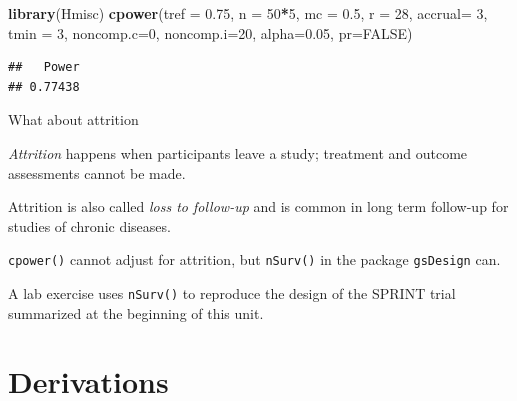 \documentclass[ignorenonframetext,]{beamer}
\newenvironment{Shaded}{\begin{snugshade}}{\end{snugshade}}
\newcommand{\DataTypeTok}[1]{\textcolor[rgb]{0.13,0.29,0.53}{#1}}
\newcommand{\DecValTok}[1]{\textcolor[rgb]{0.00,0.00,0.81}{#1}}
\newcommand{\FloatTok}[1]{\textcolor[rgb]{0.00,0.00,0.81}{#1}}
\newcommand{\KeywordTok}[1]{\textcolor[rgb]{0.13,0.29,0.53}{\textbf{#1}}}
\newcommand{\NormalTok}[1]{#1}
\newcommand{\OperatorTok}[1]{\textcolor[rgb]{0.81,0.36,0.00}{\textbf{#1}}}
\newcommand{\OtherTok}[1]{\textcolor[rgb]{0.56,0.35,0.01}{#1}}
\begin{document}
\begin{frame}[fragile]

\scriptsize

\begin{Shaded}
\begin{Highlighting}[]
\KeywordTok{library}\NormalTok{(Hmisc)}
\KeywordTok{cpower}\NormalTok{(}\DataTypeTok{tref =} \FloatTok{0.75}\NormalTok{, }\DataTypeTok{n =} \DecValTok{50}\OperatorTok{*}\DecValTok{5}\NormalTok{, }\DataTypeTok{mc =} \FloatTok{0.5}\NormalTok{, }
       \DataTypeTok{r =} \DecValTok{28}\NormalTok{, }\DataTypeTok{accrual=} \DecValTok{3}\NormalTok{, }\DataTypeTok{tmin =} \DecValTok{3}\NormalTok{, }\DataTypeTok{noncomp.c=}\DecValTok{0}\NormalTok{, }\DataTypeTok{noncomp.i=}\DecValTok{20}\NormalTok{, }
       \DataTypeTok{alpha=}\FloatTok{0.05}\NormalTok{, }\DataTypeTok{pr=}\OtherTok{FALSE}\NormalTok{)}
\end{Highlighting}
\end{Shaded}

\begin{verbatim}
##   Power 
## 0.77438
\end{verbatim}

\end{frame}

\begin{frame}{%
\protect\hypertarget{what-about-attrition}{%
What about attrition}}

\emph{Attrition} happens when participants leave a study; treatment and
outcome assessments cannot be made.

Attrition is also called \emph{loss to follow-up} and is common in long
term follow-up for studies of chronic diseases.

\texttt{cpower()} cannot adjust for attrition, but \texttt{nSurv()} in
the package \texttt{gsDesign} can.

A lab exercise uses \texttt{nSurv()} to reproduce the design of the
SPRINT trial summarized at the beginning of this unit.

\end{frame}

\hypertarget{derivations}{%
\section{Derivations}\label{derivations}}
\end{document}
